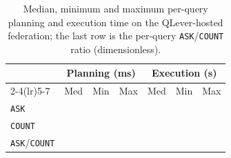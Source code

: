 \begin{table}[t]
	\centering
	\caption{Median, minimum and maximum per-query planning and execution time on the
		QLever-hosted federation; the last row is the per-query \texttt{ASK}/\texttt{COUNT}
		ratio (dimensionless).}
	\label{tab:qlever-ask-count-adhoc}
	\begin{tabular}{lrrrrrr}
		\toprule
		                            & \multicolumn{3}{c}{Planning (ms)} & \multicolumn{3}{c}{Execution (s)} \\
		\cmidrule(lr){2-4}\cmidrule(lr){5-7}
		                            & Med & Min & Max & Med & Min & Max \\
		\midrule
		\texttt{ASK}                & {} & {} & {} & {} & {} & {} \\
		\texttt{COUNT}              & {} & {} & {} & {} & {} & {} \\
		\texttt{ASK}/\texttt{COUNT} & {} & {} & {} & {} & {} & {} \\
		\bottomrule
	\end{tabular}
\end{table}
